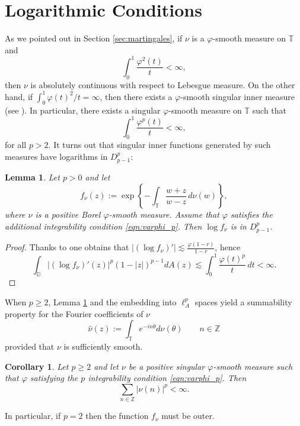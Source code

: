 \documentclass{birkjour}
\numberwithin{equation}{section}
\theoremstyle{plain}
\newtheorem{lemma}[theo]{Lemma}
\newtheorem{coro}[theo]{Corollary}
\theoremstyle{definition}
\newcommand{\T}{\mathbb{T}}
\newcommand{\D}{\mathbb{D}}
\newcommand{\Z}{\mathbb{Z}}
\newcommand{\1}{\mathds{1}}
\begin{document}
 \section{Logarithmic Conditions}
\label{sec:log}
As we pointed out in Section \ref{sec:martingales},  if $\nu$ is a $\varphi$-smooth measure on $\T$ and 
 \[
 \int_0^1\frac{\varphi^2(t)}{t}<\infty,
 \]
 then $\nu$ is absolutely continuous with respect to Lebesgue measure. On the other hand, if $\int_0^1\varphi(t)^2/t=\infty$, then there exists a $\varphi$-smooth singular inner measure (see \cite{Kahane69}). In particular, there exists a singular $\varphi$-smooth measure on $\T$ 
 such that 
 \begin{equation}
 \label{eqn:varphi_p}
 \int_0^1\frac{\varphi^p(t)}{t}<\infty,
 \end{equation}
 for all $p>2$. It turns out that singular inner functions generated by such measures have logarithms in $D^p_{p-1}$:
\begin{lemma}
    \label{prop:psum_nu}
Let $p>0$ and let 
\begin{equation}
\label{eqn:f_nu}
f_\nu(z):=\exp\left\{-\int_\T\frac{w+z}{w-z}\,d\nu(w)\right\},
\end{equation}
where $\nu$ is a positive Borel $\varphi$-smooth measure. Assume that $\varphi$ satisfies the additional integrability condition \eqref{eqn:varphi_p}. Then $\log f_\nu$ is in $D^p_{p-1}$.
\end{lemma}
\begin{proof}
Thanks to \cite[Lemma 4]{Anderson91} one obtains that $|(\log f_\nu)'|\lesssim\frac{\varphi(1-r)}{1-r}$, hence
\[
\int_{\D}|\left(\log f_\nu\right)'(z)|^p(1-|z|)^{p-1}dA(z)\lesssim \int_0^1\frac{\varphi(t)^p}{t}\,dt<\infty.
\]
\end{proof}

When $p \ge 2$, Lemma \ref{prop:psum_nu} and the embedding into $\ell^p_A$ spaces yield a summability property for the Fourier coefficients of $\nu$
\[
\hat{\nu}(z):=\int_\T e^{-in\theta}d\nu(\theta)\qquad n\in\Z
\]
provided that $\nu$ is sufficiently smooth.
\begin{coro}
\label{coro:Fourier_ellp}
Let $p\ge2$ and let $\nu$ be a positive singular $\varphi$-smooth measure such that $\varphi$ satisfying the $p$ integrability condition \eqref{eqn:varphi_p}. Then 
\[
\sum_{n\in\Z}|\hat\nu(n)|^p<\infty.
\]
\end{coro}

In particular, if $p=2$ then the function $f_\nu$  must be outer.
\end{document}
